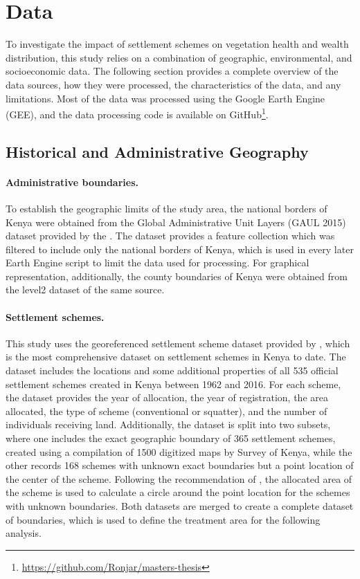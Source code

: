 \section{Data}
\label{sec:data}

To investigate the impact of settlement schemes on vegetation health and wealth distribution, this study relies on a combination of geographic, environmental, and socioeconomic data.
The following section provides a complete overview of the data sources, how they were processed, the characteristics of the data, and any limitations.
Most of the data was processed using the Google Earth Engine (GEE), and the data processing code is available on GitHub\footnote{\url{https://github.com/Ronjar/masters-thesis}}.

\subsection{Historical and Administrative Geography}
\paragraph{Administrative boundaries.}
To establish the geographic limits of the study area, the national borders of Kenya were obtained from the Global Administrative Unit Layers (GAUL 2015) dataset provided by the \cite{faoGAUL2015}.
The dataset provides a feature collection which was filtered to include only the national borders of Kenya, which is used in every later Earth Engine script to limit the data used for processing.
For graphical representation, additionally, the county boundaries of Kenya were obtained from the level2 dataset of the same source.

\paragraph{Settlement schemes.}
This study uses the georeferenced settlement scheme dataset \parencite{lukaloKenyaSettlementSchemes2022} provided by \cite{boonePromisedLandSettlement2021}, which is the most comprehensive dataset on settlement schemes in Kenya to date.
The dataset includes the locations and some additional properties of all 535 official settlement schemes created in Kenya between 1962 and 2016.
For each scheme, the dataset provides the year of allocation, the year of registration, the area allocated, the type of scheme (conventional or squatter), and the number of individuals receiving land.
Additionally, the dataset is split into two subsets, where one includes the exact geographic boundary of 365 settlement schemes,
created using a compilation of 1500 digitized maps by Survey of Kenya, while the other records 168 schemes with unknown exact boundaries but a point location of the center of the scheme.
Following the recommendation of \cite{boonePromisedLandSettlement2021}, the allocated area of the scheme is used to calculate a circle around the point location for the schemes with unknown boundaries.
Both datasets are merged to create a complete dataset of boundaries, which is used to define the treatment area for the following analysis.

